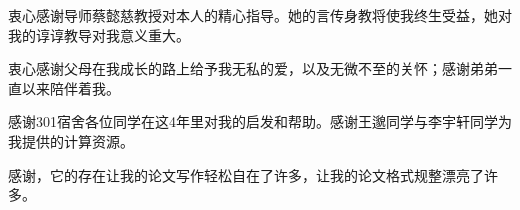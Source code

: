 \begin{acknowledgement}
  衷心感谢导师蔡懿慈教授对本人的精心指导。她的言传身教将使我终生受益，她对我的谆谆教导对我意义重大。

  衷心感谢父母在我成长的路上给予我无私的爱，以及无微不至的关怀；感谢弟弟一直以来陪伴着我。

  感谢301宿舍各位同学在这4年里对我的启发和帮助。感谢王邈同学与李宇轩同学为我提供的计算资源。

  感谢\thuthesis，它的存在让我的论文写作轻松自在了许多，让我的论文格式规整漂亮了许多。
\end{acknowledgement}
